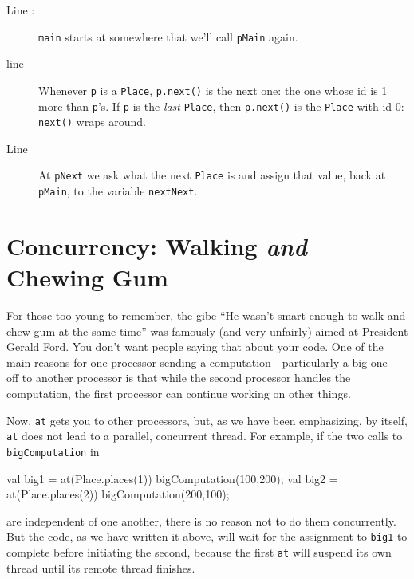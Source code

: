 \begin{description}
\item[Line :] 
{\tt main} starts at somewhere that we'll call {\tt pMain} again.    
\item[line ] 
Whenever {\tt p} is a {\tt Place}, 
{\tt p.next()} is the next one: the one whose id is 1 more than {\tt p}'s.  If
{\tt p} is the {\em last} {\tt Place}, then {\tt p.next()} is the {\tt Place}
with id 0: {\tt next()} wraps around.

\item[Line ] At {\tt pNext} we ask what the next {\tt Place}
is and assign that value, back at {\tt pMain}, to the variable {\tt nextNext}.
\end{description}

\section{Concurrency: Walking {\em and} Chewing Gum}

For those too young to remember, the gibe ``He wasn't smart enough to walk
and chew gum at the same time'' was famously (and very unfairly) aimed at
President Gerald Ford.  You don't want people saying that about your code.
One of the main reasons for one processor sending a computation---particularly
a big one---off to another processor is that while the second processor handles
the computation, the first processor can continue working on other things.
 
Now, {\tt at} gets you to other processors, but, as we have been
emphasizing, by itself, {\tt at}  does not lead to a parallel, concurrent thread.
For example, if the two calls to {\tt bigComputation} in
\begin{xten}
val big1 = at(Place.places(1)) bigComputation(100,200);
val big2 = at(Place.places(2)) bigComputation(200,100);
\end{xten}
are independent of one another, there is no reason not to do them 
concurrently.  But the code, as we have written it above, will wait for the
assignment to {\tt big1} to complete before initiating the second, because the
first {\tt at} will suspend its own thread until its remote thread finishes.  

